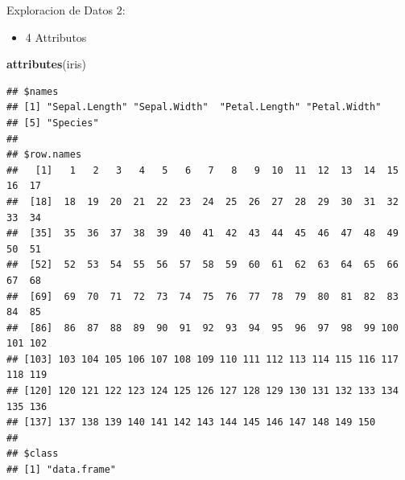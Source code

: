 \documentclass[ignorenonframetext,]{beamer}
\newenvironment{Shaded}{\begin{snugshade}}{\end{snugshade}}
\newcommand{\KeywordTok}[1]{\textcolor[rgb]{0.13,0.29,0.53}{\textbf{#1}}}
\newcommand{\NormalTok}[1]{#1}
\providecommand{\tightlist}{%
  \setlength{\itemsep}{0pt}\setlength{\parskip}{0pt}}
\begin{document}
\begin{frame}[fragile]{Exploracion de Datos 2:}

\begin{itemize}
\tightlist
\item
  4 Attributos
\end{itemize}

\begin{Shaded}
\begin{Highlighting}[]
\KeywordTok{attributes}\NormalTok{(iris)}
\end{Highlighting}
\end{Shaded}

\begin{verbatim}
## $names
## [1] "Sepal.Length" "Sepal.Width"  "Petal.Length" "Petal.Width" 
## [5] "Species"     
## 
## $row.names
##   [1]   1   2   3   4   5   6   7   8   9  10  11  12  13  14  15  16  17
##  [18]  18  19  20  21  22  23  24  25  26  27  28  29  30  31  32  33  34
##  [35]  35  36  37  38  39  40  41  42  43  44  45  46  47  48  49  50  51
##  [52]  52  53  54  55  56  57  58  59  60  61  62  63  64  65  66  67  68
##  [69]  69  70  71  72  73  74  75  76  77  78  79  80  81  82  83  84  85
##  [86]  86  87  88  89  90  91  92  93  94  95  96  97  98  99 100 101 102
## [103] 103 104 105 106 107 108 109 110 111 112 113 114 115 116 117 118 119
## [120] 120 121 122 123 124 125 126 127 128 129 130 131 132 133 134 135 136
## [137] 137 138 139 140 141 142 143 144 145 146 147 148 149 150
## 
## $class
## [1] "data.frame"
\end{verbatim}

\end{frame}
\end{document}
